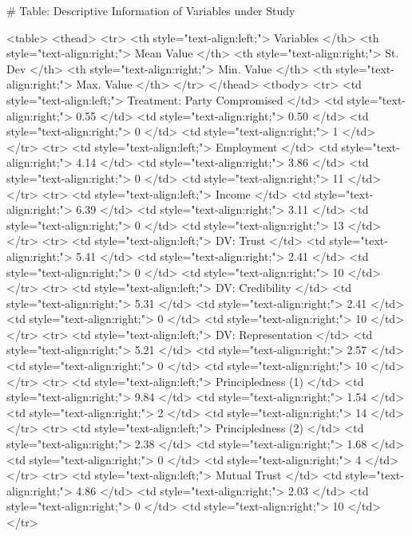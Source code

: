 # Table: Descriptive Information of Variables under Study 

<table>
 <thead>
  <tr>
   <th style="text-align:left;"> Variables </th>
   <th style="text-align:right;"> Mean Value </th>
   <th style="text-align:right;"> St. Dev </th>
   <th style="text-align:right;"> Min. Value </th>
   <th style="text-align:right;"> Max. Value </th>
  </tr>
 </thead>
<tbody>
  <tr>
   <td style="text-align:left;"> Treatment: Party Compromised </td>
   <td style="text-align:right;"> 0.55 </td>
   <td style="text-align:right;"> 0.50 </td>
   <td style="text-align:right;"> 0 </td>
   <td style="text-align:right;"> 1 </td>
  </tr>
  <tr>
   <td style="text-align:left;"> Employment </td>
   <td style="text-align:right;"> 4.14 </td>
   <td style="text-align:right;"> 3.86 </td>
   <td style="text-align:right;"> 0 </td>
   <td style="text-align:right;"> 11 </td>
  </tr>
  <tr>
   <td style="text-align:left;"> Income </td>
   <td style="text-align:right;"> 6.39 </td>
   <td style="text-align:right;"> 3.11 </td>
   <td style="text-align:right;"> 0 </td>
   <td style="text-align:right;"> 13 </td>
  </tr>
  <tr>
   <td style="text-align:left;"> DV: Trust </td>
   <td style="text-align:right;"> 5.41 </td>
   <td style="text-align:right;"> 2.41 </td>
   <td style="text-align:right;"> 0 </td>
   <td style="text-align:right;"> 10 </td>
  </tr>
  <tr>
   <td style="text-align:left;"> DV: Credibility </td>
   <td style="text-align:right;"> 5.31 </td>
   <td style="text-align:right;"> 2.41 </td>
   <td style="text-align:right;"> 0 </td>
   <td style="text-align:right;"> 10 </td>
  </tr>
  <tr>
   <td style="text-align:left;"> DV: Representation </td>
   <td style="text-align:right;"> 5.21 </td>
   <td style="text-align:right;"> 2.57 </td>
   <td style="text-align:right;"> 0 </td>
   <td style="text-align:right;"> 10 </td>
  </tr>
  <tr>
   <td style="text-align:left;"> Principledness (1) </td>
   <td style="text-align:right;"> 9.84 </td>
   <td style="text-align:right;"> 1.54 </td>
   <td style="text-align:right;"> 2 </td>
   <td style="text-align:right;"> 14 </td>
  </tr>
  <tr>
   <td style="text-align:left;"> Principledness (2) </td>
   <td style="text-align:right;"> 2.38 </td>
   <td style="text-align:right;"> 1.68 </td>
   <td style="text-align:right;"> 0 </td>
   <td style="text-align:right;"> 4 </td>
  </tr>
  <tr>
   <td style="text-align:left;"> Mutual Trust </td>
   <td style="text-align:right;"> 4.86 </td>
   <td style="text-align:right;"> 2.03 </td>
   <td style="text-align:right;"> 0 </td>
   <td style="text-align:right;"> 10 </td>
  </tr>
